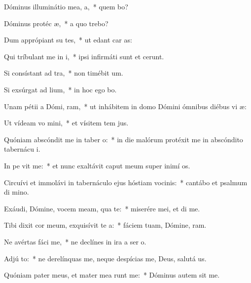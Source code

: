 \item Dóminus illuminátio mea,   a,~* quem bo?
\item Dóminus protéc  æ,~* a quo trebo?
\item Dum apprópiant su  tes,~* ut edant car as:
\item Qui tríbulant me in i,~* ipsi infirmáti sunt et cerunt.
\item Si consístant ad  tra,~* non timébit  um.
\item Si exsúrgat ad  lium,~* in hoc ego bo.
\item Unam pétii a Dómi,  ram,~* ut inhábitem in domo Dómini ómnibus diébus vi æ:
\item Ut vídeam vo mini,~* et vísitem tem jus.
\item Quóniam abscóndit me in taber o:~* in die malórum protéxit me in abscóndito tabernácu i.
\item In pe vit me:~* et nunc exaltávit caput meum super inimí os.
\item Circuívi et immolávi in tabernáculo ejus hóstiam vocinis:~* cantábo et psalmum di mino.
\item Exáudi, Dómine, vocem meam, qua   te:~* miserére mei, et di me.
\item Tibi dixit cor meum, exquisívit te  a:~* fáciem tuam, Dómine, ram.
\item Ne avértas fáci   me,~* ne declínes in ira a ser o.
\item Adjú  to:~* ne derelínquas me, neque despícias me, Deus, salutá us.
\item Quóniam pater meus, et mater mea runt me:~* Dóminus autem sit me.
